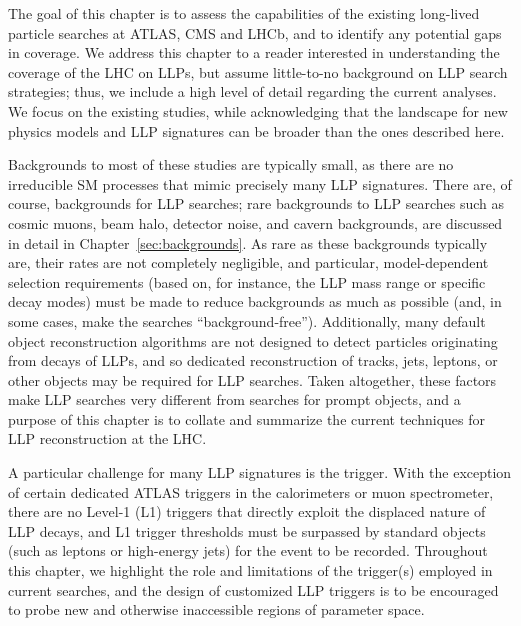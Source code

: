 
\noindent The goal of this chapter is to assess the capabilities of the existing long-lived particle searches at ATLAS, CMS and LHCb, and to identify any potential gaps in coverage.  We address this chapter to a reader interested in understanding the coverage of the LHC on LLPs, but assume little-to-no background on LLP search strategies; thus, we include a high level of detail regarding the current analyses. We focus on the  existing studies, while acknowledging that the landscape for new physics models and LLP signatures can be broader than the ones described here.

Backgrounds to most of these studies are typically small, as there are no irreducible SM processes that mimic precisely many LLP signatures.  There are, of course, backgrounds for LLP searches; rare backgrounds to LLP searches such as cosmic muons, beam halo, detector noise, and cavern backgrounds, are discussed in detail in Chapter~\ref{sec:backgrounds}. As rare as these backgrounds typically are, their rates  are not completely negligible, and particular, model-dependent selection requirements (based on, for instance, the LLP mass range or specific decay modes) must be made to reduce backgrounds as much as possible (and, in some cases, make the searches ``background-free''). Additionally, many default object reconstruction algorithms are not designed to detect particles originating from decays of LLPs, and so dedicated reconstruction of tracks, jets, leptons, or other objects may be required for LLP searches. Taken altogether, these factors make LLP searches very different from searches for prompt objects, and a purpose of this chapter is to collate and summarize the current techniques for LLP reconstruction at the LHC.

A particular challenge for many LLP signatures is the trigger. With the exception of certain dedicated ATLAS triggers in the calorimeters or muon spectrometer, there are no Level-1 (L1) triggers that directly exploit  the displaced nature of  LLP decays, and L1 trigger thresholds must be surpassed by standard objects (such as leptons or high-energy jets) for the event to be recorded. Throughout this chapter, we highlight the role and limitations of the trigger(s) employed in current searches, and the design of customized LLP triggers is to be encouraged to probe new and otherwise inaccessible regions of parameter space.

